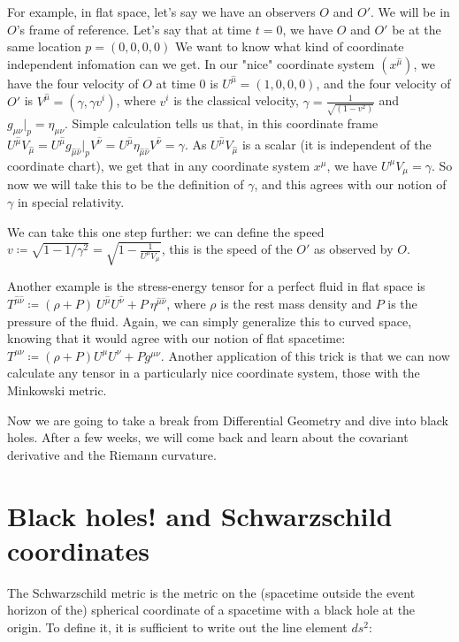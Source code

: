 \documentclass[10pt]{article}
\newcommand{\xm}{x^\mu}
\newcommand{\gmn}{g_{\mu \nu}}
\newcommand{\gmnhat}{g_{\hat{\mu} \hat{\nu}}}
\newcommand{\emnhat}{\eta_{\hat{\mu} \hat{\nu}}}
\newcommand{\emn}{\eta_{\mu \nu}}
\begin{document}
For example, in flat space, let's say we have an observers $O$ and $O'$. We will be in $O$'s frame of reference. Let's say that at time $t = 0$, we have $O$ and $O'$ be at the same location $p = (0,0,0,0)$ We want to know what kind of coordinate independent infomation can we get. In our "nice" coordinate system $(x^{\hat{\mu}})$, we have the four velocity of $O$ at time 0 is $U^{\hat{\mu}} = (1,0,0,0)$, and the four velocity of $O'$ is $V^{\hat{\mu}} = (\gamma, \gamma v^i)$, where $v^i$ is the classical velocity, $\gamma = \frac{1}{\sqrt{(1-v^2)}}$ and $\gmn|_p = \emn$. Simple calculation tells us that, in this coordinate frame $U^{\hat{\mu}} V_{\hat{\mu}} =U^{\hat{\mu}} \gmnhat|_p V^{\hat{\nu}}  = U^{\hat{\mu}} \emnhat V^{\hat{\nu}} = \gamma$. As $U^{\hat{\mu}} V_{\hat{\mu}}$ is a scalar (it is independent of the coordinate chart), we get that in any coordinate system $\xm$, we have $U^{\mu} V_{\mu} = \gamma$. So now we will take this to be the definition of $\gamma$, and this agrees with our notion of $\gamma$ in special relativity.

We can take this one step further: we can define the speed $v \coloneqq \sqrt{1- 1/{\gamma^2}} = \sqrt{1- \frac {1}{U^{\mu}{V_{\mu}}}}$, this is the speed of the $O'$ as observed by $O$.

Another example is the stress-energy tensor for a perfect fluid in flat space  is $T^{\hat{\mu}{\hat{\nu}}} 
\coloneqq (\rho + P) \ U^{\hat{\mu}}U^{\hat{\nu}} + P \ \eta^{\hat{\mu} \hat{\nu}}$, where $\rho$ is the rest mass density and $P$ is the pressure of the fluid. Again, we can simply generalize this to curved space, knowing that it would agree with our notion of flat spacetime: $T^{\mu \nu} \coloneqq (\rho + P) U^{\mu}U^{\nu} + P g^{\mu \nu}.$ Another application of this trick is that we can now calculate any tensor in a particularly nice coordinate system, those with the Minkowski metric.

Now we are going to take a break from Differential Geometry and dive into black holes. After a few weeks, we will come back and learn about the covariant derivative and the Riemann curvature.



\section{Black holes! and Schwarzschild coordinates}\label{sec:class_style}

The Schwarzschild metric is the metric on the (spacetime outside the event horizon of the) spherical coordinate of a spacetime with a black hole at the origin. To define it, it is sufficient to write out the line element $ds^2$:
\end{document}
